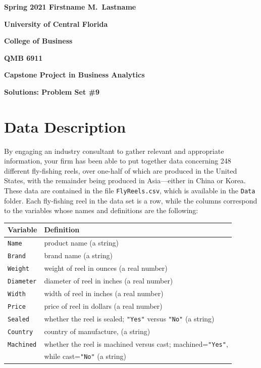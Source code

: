 \documentclass[11pt]{paper}
\begin{document}

\pagestyle{empty}
{\noindent\bf Spring 2021 \hfill Firstname M.~Lastname}
\vskip 16pt
\centerline{\bf University of Central Florida}
\centerline{\bf College of Business}
\vskip 16pt
\centerline{\bf QMB 6911}
\centerline{\bf Capstone Project in Business Analytics}
\vskip 10pt
\centerline{\bf Solutions:  Problem Set \#9}
\vskip 32pt
\noindent
% 
% 
\section{Data Description}
% 
By engaging an industry consultant to gather relevant and appropriate 
information, your firm has been able to put together data concerning 248 
different fly-fishing reels, over one-half of which are produced in the 
United States, with the remainder being produced in Asia---either in China 
or Korea.  These data are contained in the file {\tt FlyReels.csv}, which is
available in the {\tt Data} folder.
Each fly-fishing reel in the data set is a row, while the columns correspond 
to the variables whose names and definitions are the following:
\bigskip
\begin{table}[ht]
\centering
\begin{tabular}{ll}
  \hline
    Variable & Definition \\
  \hline

    {\tt Name}        &product name (a string) \\ 
    {\tt Brand}       &brand name (a string) \\ 
    {\tt Weight}      &weight of reel in ounces (a real number) \\ 
    {\tt Diameter}    &diameter of reel in inches (a real number) \\ 
    {\tt Width}       &width of reel in inches (a real number) \\ 
    {\tt Price}       &price of reel in dollars (a real number) \\ 
    {\tt Sealed}      &whether the reel is sealed; {\tt "Yes"} versus
                        {\tt "No"} (a string) \\ 
    {\tt Country}     &country of manufacture, (a string) \\ 
    {\tt Machined}    &whether the reel is machined versus cast;
                        machined={\tt "Yes"}, \\ 
                      &while cast={\tt "No"} (a string) \\ 
  \hline
\end{tabular}
\end{table}
\end{document}
